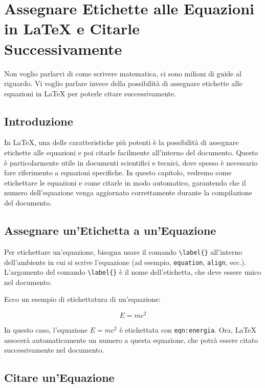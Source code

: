 \chapter[Matematica avanzata]{Assegnare Etichette alle Equazioni in LaTeX e Citarle Successivamente}

Non voglio parlarvi di come scrivere matematica, ci sono milioni di guide al riguardo. Vi voglio parlare invece della possibilità di assegnare etichette alle equazioni in LaTeX per poterle citare successivamente.

\section{Introduzione}

In LaTeX, una delle caratteristiche più potenti è la possibilità di assegnare etichette alle equazioni e poi citarle facilmente all'interno del documento. Questo è particolarmente utile in documenti scientifici e tecnici, dove spesso è necessario fare riferimento a equazioni specifiche. In questo capitolo, vedremo come etichettare le equazioni e come citarle in modo automatico, garantendo che il numero dell'equazione venga aggiornato correttamente durante la compilazione del documento.

\section{Assegnare un'Etichetta a un'Equazione}

Per etichettare un'equazione, bisogna usare il comando \verb|\label{}| all'interno dell'ambiente in cui si scrive l'equazione (ad esempio, \verb|equation|, \verb|align|, ecc.). L'argomento del comando \verb|\label{}| è il nome dell'etichetta, che deve essere unico nel documento.

Ecco un esempio di etichettatura di un'equazione:

\begin{equation}
	E = mc^2
	\label{eqn:energia}
\end{equation}

In questo caso, l'equazione \( E = mc^2 \) è etichettata con \texttt{eqn:energia}. Ora, LaTeX assocerà automaticamente un numero a questa equazione, che potrà essere citato successivamente nel documento.

\section{Citare un'Equazione}

